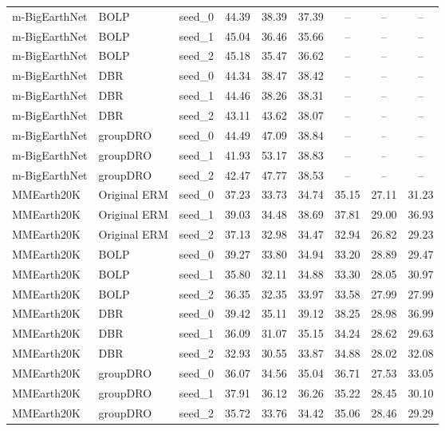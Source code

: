 \documentclass[11pt]{article}
\begin{document}
\begin{table}[h!]
{\begin{tabular}{lllcccccc}
m-BigEarthNet & BOLP & seed\_0 & 44.39 & 38.39 & 37.39 & -- & -- & -- \\
m-BigEarthNet & BOLP & seed\_1 & 45.04 & 36.46 & 35.66 & -- & -- & -- \\
m-BigEarthNet & BOLP & seed\_2 & 45.18 & 35.47 & 36.62 & -- & -- & -- \\

m-BigEarthNet & DBR & seed\_0 & 44.34 & 38.47 & 38.42 & -- & -- & -- \\
m-BigEarthNet & DBR & seed\_1 & 44.46 & 38.26 & 38.31 & -- & -- & -- \\
m-BigEarthNet & DBR & seed\_2 & 43.11 & 43.62 & 38.07 & -- & -- & -- \\

m-BigEarthNet & groupDRO & seed\_0 & 44.49 & 47.09 & 38.84 & -- & -- & -- \\
m-BigEarthNet & groupDRO & seed\_1 & 41.93 & 53.17 & 38.83 & -- & -- & -- \\
m-BigEarthNet & groupDRO & seed\_2 & 42.47 & 47.77 & 38.53 & -- & -- & -- \\

\midrule

MMEarth20K & Original ERM & seed\_0 & 37.23 & 33.73 & 34.74 & 35.15 & 27.11 & 31.23 \\
MMEarth20K & Original ERM & seed\_1 & 39.03 & 34.48 & 38.69 & 37.81 & 29.00 & 36.93 \\
MMEarth20K & Original ERM & seed\_2 & 37.13 & 32.98 & 34.47 & 32.94 & 26.82 & 29.23 \\

MMEarth20K & BOLP & seed\_0 & 39.27 & 33.80 & 34.94 & 33.20 & 28.89 & 29.47 \\
MMEarth20K & BOLP & seed\_1 & 35.80 & 32.11 & 34.88 & 33.30 & 28.05 & 30.97 \\
MMEarth20K & BOLP & seed\_2 & 36.35 & 32.35 & 33.97 & 33.58 & 27.99 & 27.99 \\

MMEarth20K & DBR & seed\_0 & 39.42 & 35.11 & 39.12 & 38.25 & 28.98 & 36.99 \\
MMEarth20K & DBR & seed\_1 & 36.09 & 31.07 & 35.15 & 34.24 & 28.62 & 29.63 \\
MMEarth20K & DBR & seed\_2 & 32.93 & 30.55 & 33.87 & 34.88 & 28.02 & 32.08 \\

MMEarth20K & groupDRO & seed\_0 & 36.07 & 34.56 & 35.04 & 36.71 & 27.53 & 33.05 \\
MMEarth20K & groupDRO & seed\_1 & 37.91 & 36.12 & 36.26 & 35.22 & 28.45 & 30.10 \\
MMEarth20K & groupDRO & seed\_2 & 35.72 & 33.76 & 34.42 & 35.06 & 28.46 & 29.29 \\


\end{tabular}}
\end{table}
\end{document}
